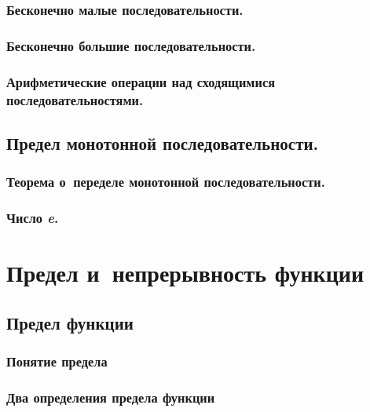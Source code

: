 \documentclass[14pt, oneside]{extbook}
\begin{document}
\subsection{Бесконечно малые последовательности.}

\subsection{Бесконечно большие последовательности.}

\subsection{Арифметические операции над сходящимися последовательностями.}

\section{Предел монотонной последовательности.}
\subsection{Теорема о~переделе монотонной последовательности.}

\subsection{Число \textit{e}.}



\chapter{Предел и~непрерывность функции}
\section{Предел функции}
\subsection{Понятие предела}\label{sec:4_1_1}

\subsection{Два определения предела функции}

\end{document}
